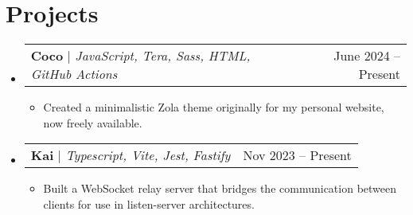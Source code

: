 \documentclass[letterpaper,11pt]{article}
\makeatletter
\newcommand{\resumeItem}[1]{
  \item\small{#1}
}
\newcommand{\resumeProjectHeading}[2]{
    \item
    \begin{tabular*}{0.97\textwidth}{l@{\extracolsep{\fill}}r}
      \small#1 & #2 \\
    \end{tabular*}\vspace{-7pt}
}
\newcommand{\resumeSubHeadingListStart}{\begin{itemize}[leftmargin=0.15in, label={}]}
\newcommand{\resumeSubHeadingListEnd}{\end{itemize}}
\newcommand{\resumeItemListStart}{\begin{itemize}}
\newcommand{\resumeItemListEnd}{\end{itemize}}
\makeatother
\begin{document}
\section{Projects}
    \resumeSubHeadingListStart
      \resumeProjectHeading
          {\textbf{Coco} $|$ \emph{JavaScript, Tera, Sass, HTML, GitHub Actions}}{June 2024 -- Present}
          \resumeItemListStart
            \resumeItem{Created a minimalistic Zola theme originally for my personal website, now freely available.}
          \resumeItemListEnd
      \resumeProjectHeading
          {\textbf{Kai} $|$ \emph{Typescript, Vite, Jest, Fastify }}{Nov 2023 -- Present}
          \resumeItemListStart
            \resumeItem{Built a WebSocket relay server that bridges the communication between clients for use in listen-server architectures.}
          \resumeItemListEnd
    \resumeSubHeadingListEnd
\end{document}
